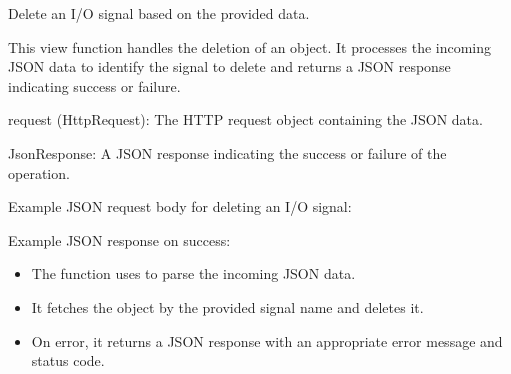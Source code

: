 \documentclass[letterpaper,10pt,english]{sphinxmanual}
\begin{document}
\begin{fulllineitems}
\label{\detokenize{app:app.views.delete_iosignal}}
\pysigstartsignatures
{}
\pysigstopsignatures
\sphinxAtStartPar
Delete an I/O signal based on the provided data.

\sphinxAtStartPar
This view function handles the deletion of an  object. 
It processes the incoming JSON data to identify the signal to delete and 
returns a JSON response indicating success or failure.
\begin{description}
\sphinxAtStartPar
request (HttpRequest): The HTTP request object containing the JSON data.

\sphinxAtStartPar
JsonResponse: A JSON response indicating the success or failure of the operation.

\sphinxAtStartPar
Example JSON request body for deleting an I/O signal:

\begin{sphinxVerbatim}[commandchars=\\\{\}]
\end{sphinxVerbatim}

\sphinxAtStartPar
Example JSON response on success:

\begin{sphinxVerbatim}[commandchars=\\\{\}]
\end{sphinxVerbatim}

\begin{itemize}
\item {} 
\sphinxAtStartPar
The function uses  to parse the incoming JSON data.

\item {} 
\sphinxAtStartPar
It fetches the  object by the provided signal name and deletes it.

\item {} 
\sphinxAtStartPar
On error, it returns a JSON response with an appropriate error message and status code.

\end{itemize}

\end{description}

\end{fulllineitems}
\end{document}
